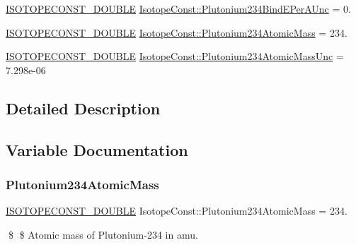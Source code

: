 \begin{DoxyCompactItemize}
\mbox{\hyperlink{group___isotope_const-_macros_ga8f45a7272ce02c0b4c65c44636ed719a}{I\+S\+O\+T\+O\+P\+E\+C\+O\+N\+S\+T\+\_\+\+D\+O\+U\+B\+LE}} \mbox{\hyperlink{group___isotope_const-_plutonium-_pu234_ga27399e69ae8b291cfeb642db067c14f4}{Isotope\+Const\+::\+Plutonium234\+Bind\+E\+Per\+A\+Unc}} = 0.
\item 
\mbox{\hyperlink{group___isotope_const-_macros_ga8f45a7272ce02c0b4c65c44636ed719a}{I\+S\+O\+T\+O\+P\+E\+C\+O\+N\+S\+T\+\_\+\+D\+O\+U\+B\+LE}} \mbox{\hyperlink{group___isotope_const-_plutonium-_pu234_ga5677f20ab43861c608dff11b361d7f73}{Isotope\+Const\+::\+Plutonium234\+Atomic\+Mass}} = 234.
\item 
\mbox{\hyperlink{group___isotope_const-_macros_ga8f45a7272ce02c0b4c65c44636ed719a}{I\+S\+O\+T\+O\+P\+E\+C\+O\+N\+S\+T\+\_\+\+D\+O\+U\+B\+LE}} \mbox{\hyperlink{group___isotope_const-_plutonium-_pu234_ga3f3c60e19f8cedd6d705a680c3bd210f}{Isotope\+Const\+::\+Plutonium234\+Atomic\+Mass\+Unc}} = 7.\+298e-\/06
\end{DoxyCompactItemize}


\subsection{Detailed Description}


\subsection{Variable Documentation}
\mbox{\label{group___isotope_const-_plutonium-_pu234_ga5677f20ab43861c608dff11b361d7f73}} 
\subsubsection{\texorpdfstring{Plutonium234\+Atomic\+Mass}{Plutonium234AtomicMass}}
{\footnotesize\ttfamily \mbox{\hyperlink{group___isotope_const-_macros_ga8f45a7272ce02c0b4c65c44636ed719a}{I\+S\+O\+T\+O\+P\+E\+C\+O\+N\+S\+T\+\_\+\+D\+O\+U\+B\+LE}} Isotope\+Const\+::\+Plutonium234\+Atomic\+Mass = 234.}

\$ \$ Atomic mass of Plutonium-\/234 in amu. \mbox{\label{group___isotope_const-_plutonium-_pu234_ga3f3c60e19f8cedd6d705a680c3bd210f}} 
